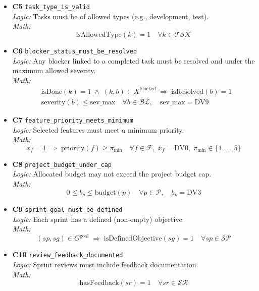 \documentclass[11pt,a4paper]{article}
\begin{document}
\begin{itemize}[leftmargin=2em]
  \item \textbf{C5} \texttt{task\_type\_is\_valid} \\
  \emph{Logic:} Tasks must be of allowed types (e.g., development, test). \\
  \emph{Math:}
  \[
    \mathrm{isAllowedType}(k)=1 \quad\forall k\in\mathcal{TSK}
  \]

  \item \textbf{C6} \texttt{blocker\_status\_must\_be\_resolved} \\
  \emph{Logic:} Any blocker linked to a completed task must be resolved and under the maximum allowed severity. \\
  \emph{Math:}
  \[
    \begin{aligned}
    &\mathrm{isDone}(k)=1 \;\wedge\; (k,b)\in X^{\mathrm{blocked}} \;\Rightarrow\; \mathrm{isResolved}(b)=1 \\
    &\mathrm{severity}(b)\le \mathrm{sev\_max} \quad \forall b\in\mathcal{BL},\quad \mathrm{sev\_max}=\text{DV9}
    \end{aligned}
  \]

  \item \textbf{C7} \texttt{feature\_priority\_meets\_minimum} \\
  \emph{Logic:} Selected features must meet a minimum priority. \\
  \emph{Math:}
  \[
    x_f=1 \;\Rightarrow\; \mathrm{priority}(f)\ge \pi_{\min} \quad\forall f\in\mathcal{F},\; x_f=\text{DV0},\;
    \pi_{\min}\in\{1,\dots,5\}
  \]

  \item \textbf{C8} \texttt{project\_budget\_under\_cap} \\
  \emph{Logic:} Allocated budget may not exceed the project budget cap. \\
  \emph{Math:}
  \[
    0 \le b_p \le \mathrm{budget}(p) \quad\forall p\in\mathcal{P},\quad b_p=\text{DV3}
  \]

  \item \textbf{C9} \texttt{sprint\_goal\_must\_be\_defined} \\
  \emph{Logic:} Each sprint has a defined (non-empty) objective. \\
  \emph{Math:}
  \[
    (sp,sg)\in G^{\mathrm{goal}} \;\Rightarrow\; \mathrm{isDefinedObjective}(sg)=1 \quad\forall sp\in\mathcal{SP}
  \]

  \item \textbf{C10} \texttt{review\_feedback\_documented} \\
  \emph{Logic:} Sprint reviews must include feedback documentation. \\
  \emph{Math:}
  \[
    \mathrm{hasFeedback}(sr)=1 \quad\forall sr\in\mathcal{SR}
  \]


\end{itemize}
\end{document}
